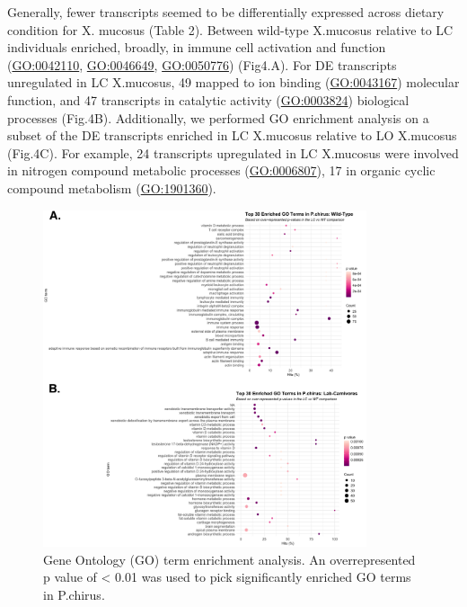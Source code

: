 \documentclass[12pt,]{article}
\begin{document}
Generally, fewer transcripts seemed to be differentially expressed
across dietary condition for X. mucosus (Table 2). Between wild-type
X.mucosus relative to LC individuals enriched, broadly, in immune cell
activation and function (\url{GO:0042110}, \url{GO:0046649},
\url{GO:0050776}) (Fig4.A). For DE transcripts unregulated in LC
X.mucosus, 49 mapped to ion binding (\url{GO:0043167}) molecular
function, and 47 transcripts in catalytic activity (\url{GO:0003824})
biological processes (Fig.4B). Additionally, we performed GO enrichment
analysis on a subset of the DE transcripts enriched in LC X.mucosus
relative to LO X.mucosus (Fig.4C). For example, 24 transcripts
upregulated in LC X.mucosus were involved in nitrogen compound metabolic
processes (\url{GO:0006807}), 17 in organic cyclic compound metabolism
(\url{GO:1901360}).

\begin{figure}[htbp]
\centering
\includegraphics[width=0.85\textwidth]{output/figures/pc_combined_top30_GOseq.png}
\caption{Gene Ontology (GO) term enrichment analysis. An overrepresented p value of < 0.01 was used to pick significantly enriched GO terms in P.chirus.}
\end{figure}
\end{document}
